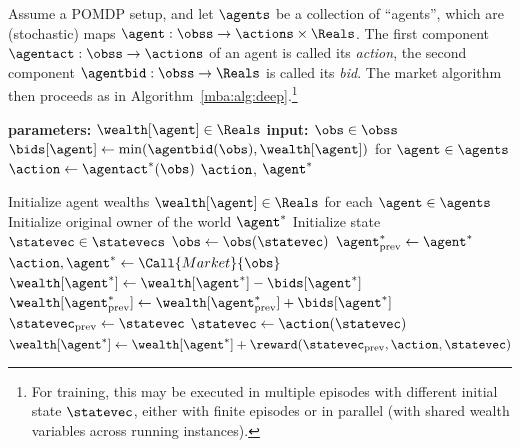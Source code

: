 \begin{definition}
Assume a POMDP setup, and let $\agents$ be a collection of ``agents'', which are (stochastic) maps $\agent:\obss\to\actions\times\Reals$. The first component $\agentact:\obss\to\actions$ of an agent is called its \emph{action}, the second component $\agentbid:\obss\to\Reals$ is called its \emph{bid}. The market algorithm then proceeds as in Algorithm~\ref{mba:alg:deep}.\footnote{For training, this may be executed in multiple episodes with different initial state $\statevec$, either with finite episodes or in parallel (with shared wealth variables across running instances).}

\begin{algorithm}[tb]
\caption{Deep market}
\label{mba:alg:deep}
\begin{algorithmic}

\State \textbf{parameters: } $\wealth [\agent]\in\Reals$ 
\State \textbf{input: $\obs\in\obss$}
\State $\bids[\agent]\gets\min(\agentbid(\obs),\wealth[\agent])$ for $\agent\in\agents$
\State $\action\gets \agentact^*(\obs)$
\State \Return $\action$, $\agent^*$
\EndProcedure

\State Initialize agent wealths $\wealth [\agent]\in\Reals$ for each $\agent\in\agents$
\State Initialize original owner of the world $\agent^*$
\State Initialize state $\statevec\in\statevecs$
\State $\obs\gets\obs(\statevec)$
\State $\agent^*_{\text{prev}}\gets\agent^*$
\State $\action, \agent^*\gets \Call{Market}{\obs}$
\State $\wealth[\agent^*]\gets\wealth[\agent^*]-\bids[\agent^*]$
\State $\wealth[\agent^*_{\text{prev}}]\gets\wealth[\agent^*_{\text{prev}}]+\bids[\agent^*]$
\State $\statevec_{\text{prev}}\gets\statevec$
\State $\statevec\gets\action(\statevec)$
\State $\wealth[\agent^*]\gets\wealth[\agent^*]+\reward(\statevec_{\text{prev}},\action,\statevec)$
\EndWhile
\EndProcedure
\end{algorithmic}
\end{algorithm}

\label{mba:def:deep}
\end{definition}

